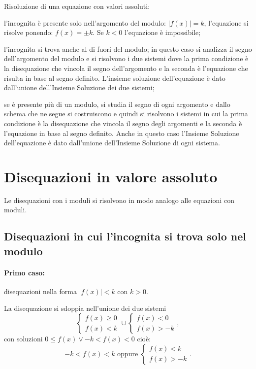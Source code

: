 \begin{procedura} {Risoluzione di una equazione con valori assoluti:}
\begin{enumeratea}
\item l'incognita è presente solo nell'argomento del modulo: $\left|f(x)\right|=k$, l’equazione si risolve ponendo: $f(x)=\pm k$. Se $k<0$ l'equazione è impossibile;
\item l’incognita si trova anche al di fuori del modulo; in questo caso si analizza il segno dell’argomento del modulo e si risolvono i due sistemi dove la prima condizione è la disequazione che vincola il segno dell'argomento e la seconda è l'equazione che risulta in base al segno definito. L'insieme soluzione dell'equazione è dato dall'unione dell'Insieme Soluzione dei due sistemi;
\item se è presente più di un modulo, si studia il segno di ogni argomento e dallo schema che ne segue si costruiscono e quindi si risolvono i sistemi in cui la prima condizione è la disequazione che vincola il segno degli argomenti e la seconda è l'equazione in base al segno definito. Anche in questo caso l'Insieme Soluzione dell'equazione è dato dall'unione dell'Insieme Soluzione di ogni sistema.
\end{enumeratea}
\end{procedura}

\section{Disequazioni in valore assoluto}
Le disequazioni con i moduli si risolvono in modo analogo alle equazioni con moduli.

\subsection{Disequazioni in cui l'incognita si trova solo nel modulo}
\paragraph{Primo caso:} disequazioni nella forma $\left|f(x)\right|<k$ con $ k>0 $.

La disequazione si sdoppia nell'unione dei due sistemi 
\[\left\{\begin{array}{l}{f(x)\ge 0}\\{f(x)<k}\end{array}\right.\cup\left\{\begin{array}{l}{f(x)< 0}\\{f(x)>-k}\end{array}\right.,\]
con soluzioni $ 0\le f(x)\vee -k<f(x)<0 $ cioè:
\[-k<f(x)<k \text{ oppure }\left\{\begin{array}{l}{f(x)< k}\\{f(x)>-k}\end{array}\right..\]


